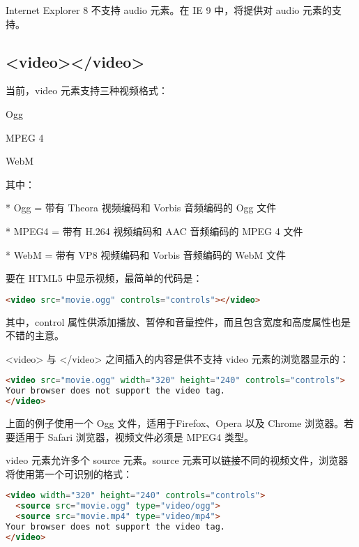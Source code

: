 Internet Explorer 8 不支持 audio 元素。在 IE 9 中，将提供对 audio 元素的支持。




\subsection{<video></video>}

当前，video 元素支持三种视频格式：

\begin{compactitem}
\item Ogg
\item MPEG 4
\item WebM
\end{compactitem}

其中：

\begin{compactitem}
\item[*] Ogg = 带有 Theora 视频编码和 Vorbis 音频编码的 Ogg 文件
\item[*] MPEG4 = 带有 H.264 视频编码和 AAC 音频编码的 MPEG 4 文件
\item[*] WebM = 带有 VP8 视频编码和 Vorbis 音频编码的 WebM 文件
\end{compactitem}


要在 HTML5 中显示视频，最简单的代码是：

\begin{lstlisting}[language=HTML]
<video src="movie.ogg" controls="controls"></video>
\end{lstlisting}

其中，control 属性供添加播放、暂停和音量控件，而且包含宽度和高度属性也是不错的主意。


<video> 与 </video> 之间插入的内容是供不支持 video 元素的浏览器显示的：

\begin{lstlisting}[language=HTML]
<video src="movie.ogg" width="320" height="240" controls="controls">
Your browser does not support the video tag.
</video>
\end{lstlisting}

上面的例子使用一个 Ogg 文件，适用于Firefox、Opera 以及 Chrome 浏览器。若要适用于 Safari 浏览器，视频文件必须是 MPEG4 类型。

video 元素允许多个 source 元素。source 元素可以链接不同的视频文件，浏览器将使用第一个可识别的格式：

\begin{lstlisting}[language=HTML]
<video width="320" height="240" controls="controls">
  <source src="movie.ogg" type="video/ogg">
  <source src="movie.mp4" type="video/mp4">
Your browser does not support the video tag.
</video>
\end{lstlisting}


